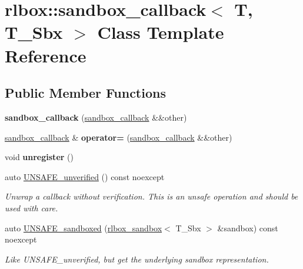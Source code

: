 \hypertarget{classrlbox_1_1sandbox__callback}{}\section{rlbox\+:\+:sandbox\+\_\+callback$<$ T, T\+\_\+\+Sbx $>$ Class Template Reference}
\label{classrlbox_1_1sandbox__callback}
\subsection*{Public Member Functions}
\begin{DoxyCompactItemize}
\item 
\mbox{\label{classrlbox_1_1sandbox__callback_af9453a813aa03d7b817b31f4ff82ce69}} 
{\bfseries sandbox\+\_\+callback} (\hyperlink{classrlbox_1_1sandbox__callback}{sandbox\+\_\+callback} \&\&other)
\item 
\mbox{\label{classrlbox_1_1sandbox__callback_ac20b4643ac1c7f887e47e80f73e81ebb}} 
\hyperlink{classrlbox_1_1sandbox__callback}{sandbox\+\_\+callback} \& {\bfseries operator=} (\hyperlink{classrlbox_1_1sandbox__callback}{sandbox\+\_\+callback} \&\&other)
\item 
\mbox{\label{classrlbox_1_1sandbox__callback_a533080e1c309f61779c132037c232c8d}} 
void {\bfseries unregister} ()
\item 
\mbox{\label{classrlbox_1_1sandbox__callback_a9d7a4e08413d3989ce8633ea459b1110}} 
auto \hyperlink{classrlbox_1_1sandbox__callback_a9d7a4e08413d3989ce8633ea459b1110}{U\+N\+S\+A\+F\+E\+\_\+unverified} () const noexcept
\begin{DoxyCompactList}\small\item\em Unwrap a callback without verification. This is an unsafe operation and should be used with care. \end{DoxyCompactList}\item 
auto \hyperlink{classrlbox_1_1sandbox__callback_a0a71e99d85bd22cd642327017c863b26}{U\+N\+S\+A\+F\+E\+\_\+sandboxed} (\hyperlink{classrlbox_1_1rlbox__sandbox}{rlbox\+\_\+sandbox}$<$ T\+\_\+\+Sbx $>$ \&sandbox) const noexcept
\begin{DoxyCompactList}\small\item\em Like U\+N\+S\+A\+F\+E\+\_\+unverified, but get the underlying sandbox representation. \end{DoxyCompactList}\item 

\end{DoxyCompactItemize}

